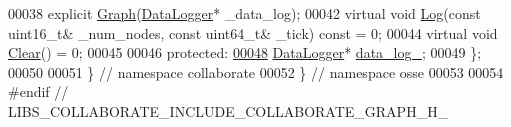 \begin{DoxyCode}
00038   \textcolor{keyword}{explicit} \hyperlink{classosse_1_1collaborate_1_1_graph_aa6e69d08b74393ecfa68cbf915d7eabc}{Graph}(\hyperlink{classosse_1_1collaborate_1_1_data_logger}{DataLogger}* \_data\_log);
00042   \textcolor{keyword}{virtual} \textcolor{keywordtype}{void} \hyperlink{classosse_1_1collaborate_1_1_graph_abaef7c4642242e096d2bbfc74b8d1d07}{Log}(\textcolor{keyword}{const} uint16\_t& \_num\_nodes, \textcolor{keyword}{const} uint64\_t& \_tick) \textcolor{keyword}{const} = 0;
00044   \textcolor{keyword}{virtual} \textcolor{keywordtype}{void} \hyperlink{classosse_1_1collaborate_1_1_graph_a92b99db1a453e58d1fb3fc134a8fd8ba}{Clear}() = 0;
00045 
00046  \textcolor{keyword}{protected}:
\hyperlink{classosse_1_1collaborate_1_1_graph_a33e2d89c03913f2bb033a215b5f1efa6}{00048}   \hyperlink{classosse_1_1collaborate_1_1_data_logger}{DataLogger}* \hyperlink{classosse_1_1collaborate_1_1_graph_a33e2d89c03913f2bb033a215b5f1efa6}{data\_log\_};
00049 \};
00050 
00051 \}  \textcolor{comment}{// namespace collaborate}
00052 \}  \textcolor{comment}{// namespace osse}
00053 
00054 \textcolor{preprocessor}{#endif  // LIBS\_COLLABORATE\_INCLUDE\_COLLABORATE\_GRAPH\_H\_}
\end{DoxyCode}
